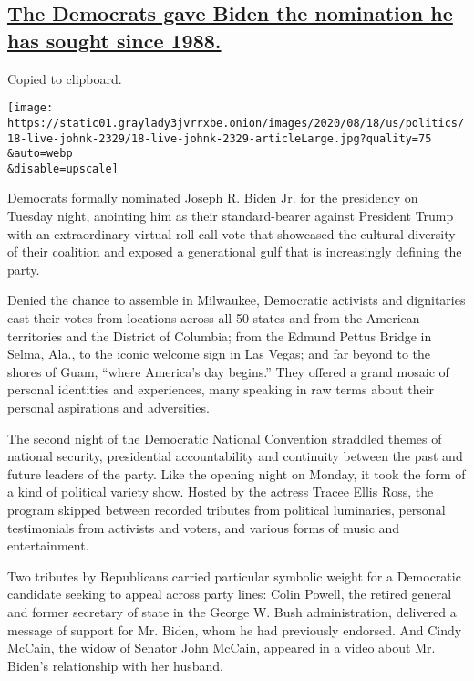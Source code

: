 \hypertarget{the-democrats-gave-biden-the-nomination-he-has-sought-since-1988}{%
\subsection{\texorpdfstring{\protect\hyperlink{the-democrats-gave-biden-the-nomination-he-has-sought-since-1988}{The
Democrats gave Biden the nomination he has sought since
1988.}}{The Democrats gave Biden the nomination he has sought since 1988.}}\label{the-democrats-gave-biden-the-nomination-he-has-sought-since-1988}}

Copied to clipboard.

\texttt{[image: https://static01.graylady3jvrrxbe.onion/images/2020/08/18/us/politics/18-live-johnk-2329/18-live-johnk-2329-articleLarge.jpg?quality=75\\\&auto=webp\\\&disable=upscale]}

\href{https://www.nytimes3xbfgragh.onion/2020/08/18/us/politics/roll-call-pass-dnc.html}{Democrats
formally nominated Joseph R. Biden Jr.} for the presidency on Tuesday
night, anointing him as their standard-bearer against President Trump
with an extraordinary virtual roll call vote that showcased the cultural
diversity of their coalition and exposed a generational gulf that is
increasingly defining the party.

Denied the chance to assemble in Milwaukee, Democratic activists and
dignitaries cast their votes from locations across all 50 states and
from the American territories and the District of Columbia; from the
Edmund Pettus Bridge in Selma, Ala., to the iconic welcome sign in Las
Vegas; and far beyond to the shores of Guam, ``where America's day
begins.'' They offered a grand mosaic of personal identities and
experiences, many speaking in raw terms about their personal aspirations
and adversities.

The second night of the Democratic National Convention straddled themes
of national security, presidential accountability and continuity between
the past and future leaders of the party. Like the opening night on
Monday, it took the form of a kind of political variety show. Hosted by
the actress Tracee Ellis Ross, the program skipped between recorded
tributes from political luminaries, personal testimonials from activists
and voters, and various forms of music and entertainment.

Two tributes by Republicans carried particular symbolic weight for a
Democratic candidate seeking to appeal across party lines: Colin Powell,
the retired general and former secretary of state in the George W. Bush
administration, delivered a message of support for Mr. Biden, whom he
had previously endorsed. And Cindy McCain, the widow of Senator John
McCain, appeared in a video about Mr. Biden's relationship with her
husband.

